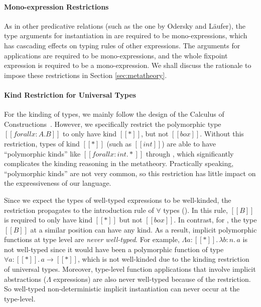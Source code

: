 \paragraph{Mono-expression Restrictions}
As in other predicative relations (such as the one by Odersky and L\"aufer),
the type arguments for instantiation in  are
required to be mono-expressions, which has cascading effects on typing rules of
other expressions. The arguments for applications are required to be
mono-expressions, and the whole fixpoint expression is required to be a
mono-expression. We shall
discuss the rationale to impose these restrictions in Section \ref{sec:metatheory}.

\paragraph{Kind Restriction for Universal Types}
\label{sec:kind-restriction}

For the kinding of types, we mainly follow the design of the Calculus of
Constructions~\citep{coc}. However, we specifically restrict
the polymorphic type $[[forall x : A. B]]$ to only have kind $[[*]]$, but not $[[box]]$.
Without this restriction, types of kind $[[*]]$ (such as $[[int]]$) are able to
have ``polymorphic kinds'' like $[[forall x : int. *]]$ through ,
which significantly complicates the kinding reasoning in the metatheory.
Practically speaking, ``polymorphic kinds'' are not very common, so this
restriction has little impact on the expressiveness of our language.

Since we expect the types of well-typed expressions to be well-kinded,
the restriction propagates to the introduction rule of $\forall$ types ().
In this rule, $[[B]]$ is required to only have kind $[[*]]$ but not $[[box]]$.
In contrast, for , the type $[[B]]$ at a similar position can have any kind.
As a result, implicit polymorphic functions at type level are \emph{never well-typed}.
For example, $\Lambda a : [[*]].\, \lambda b : n.\, a$ is not
well-typed since it would have been a polymorphic function of type
$\forall a : [[*]].\, a \rightarrow [[*]]$, which is not well-kinded due to the
kinding restriction of universal types.
Moreover, type-level function applications that involve implicit
abstractions ($\Lambda$ expressions) are also never well-typed
because of the restriction. So well-typed non-deterministic implicit instantiation can never occur
at the type-level.


